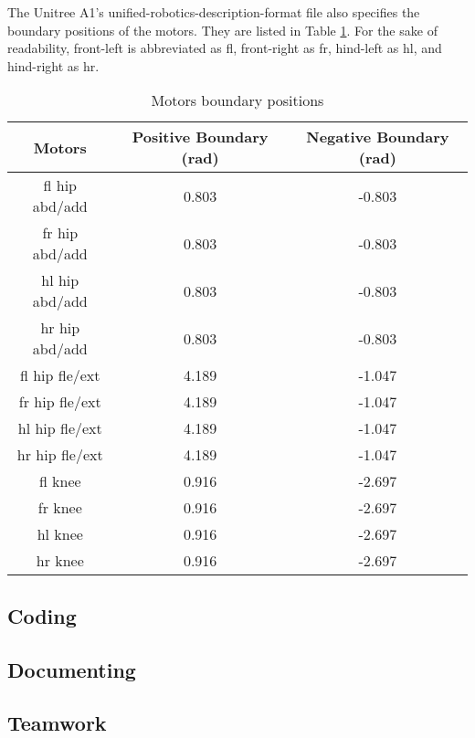 The Unitree A1's unified-robotics-description-format file also specifies the boundary positions of the motors. They are listed in Table \ref{table:motors_boundary_positions}. For the sake of readability, front-left is abbreviated as fl, front-right as fr, hind-left as hl, and hind-right as hr.

\begin{table}[htbp]
   \centering
   \caption{Motors boundary positions}
   \begin{tabular}{|c|c|c|}
   \hline
   Motors & Positive Boundary (rad) & Negative Boundary (rad) \\ \hline
   fl hip abd/add & 0.803 & -0.803 \\ \hline
   fr hip abd/add & 0.803 & -0.803 \\ \hline
   hl hip abd/add & 0.803 & -0.803 \\ \hline
   hr hip abd/add & 0.803 & -0.803 \\ \hline
   fl hip fle/ext & 4.189 & -1.047 \\ \hline
   fr hip fle/ext & 4.189 & -1.047 \\ \hline
   hl hip fle/ext & 4.189 & -1.047 \\ \hline
   hr hip fle/ext & 4.189 & -1.047 \\ \hline
   fl knee        & 0.916 & -2.697 \\ \hline
   fr knee        & 0.916 & -2.697 \\ \hline
   hl knee        & 0.916 & -2.697 \\ \hline
   hr knee        & 0.916 & -2.697 \\ \hline
   \end{tabular}
   \label{table:motors_boundary_positions}
\end{table}



\subsection{Coding}



\subsection{Documenting}



\subsection{Teamwork}
